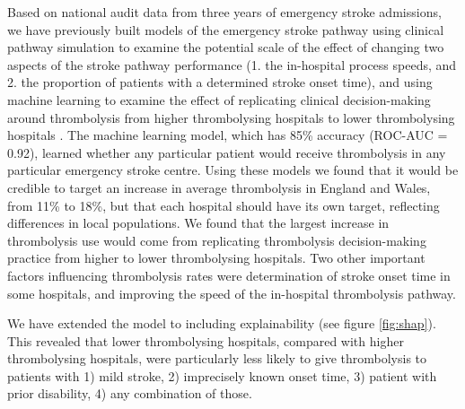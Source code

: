 Based on national audit data from three years of emergency stroke admissions, we have previously built models of the emergency stroke pathway using clinical pathway simulation to examine the potential scale of the effect of changing two aspects of the stroke pathway performance (1. the in-hospital process speeds, and 2. the proportion of patients with a determined stroke onset time), and using machine learning to examine the effect of replicating clinical decision-making around thrombolysis from higher thrombolysing hospitals to lower thrombolysing hospitals \cite{allen_using_2022, allen_use_2022}. The machine learning model, which has 85\% accuracy (ROC-AUC = 0.92), learned whether any particular patient would receive thrombolysis in any particular emergency stroke centre. Using these models we found that it would be credible to target an increase in average thrombolysis in England and Wales, from 11\% to 18\%, but that each hospital should have its own target, reflecting differences in local populations. We found that the largest increase in thrombolysis use would come from replicating thrombolysis decision-making practice from higher to lower thrombolysing hospitals. Two other important factors influencing thrombolysis rates were determination of stroke onset time in some hospitals, and improving the speed of the in-hospital thrombolysis pathway.

We have extended the model to including explainability \cite{pearn_what_2023} (see figure \ref{fig:shap}). This revealed that lower thrombolysing hospitals, compared with higher thrombolysing hospitals, were particularly less likely to give thrombolysis to patients with 1) mild stroke, 2) imprecisely known onset time, 3) patient with prior disability, 4) any combination of those.

